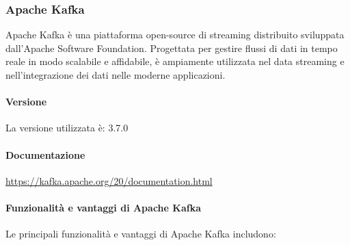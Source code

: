 \subsubsection{Apache Kafka}
Apache Kafka è una piattaforma open-source di streaming distribuito sviluppata dall'Apache Software Foundation. Progettata per gestire flussi di dati in tempo reale in modo scalabile e affidabile, è ampiamente utilizzata nel data streaming e nell'integrazione dei dati nelle moderne applicazioni.

\paragraph{Versione}
La versione utilizzata è: 3.7.0
\paragraph{Documentazione}
\href{https://kafka.apache.org/20/documentation.html}{https://kafka.apache.org/20/documentation.html}

\paragraph{Funzionalità e vantaggi di Apache Kafka}
Le principali funzionalità e vantaggi di Apache Kafka includono:

